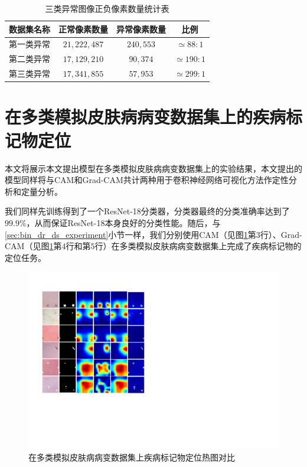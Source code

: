 \begin{table}[h]
	\centering
	\caption{三类异常图像正负像素数量统计表}
	\label{tab:multi_ds_pixel_freqs}
	\begin{tabular}{c|c|c|c}
		\toprule[2pt]
		数据集名称 & 正常像素数量 & 异常像素数量 & 比例 \\
		\midrule[2pt]
		第一类异常&  $21,222,487$ & $240,553$ & $\simeq 88: 1$ \\ \hline
		第二类异常&  $17,129,210$ & $90,374$ & $\simeq 190: 1$ \\ \hline
		第三类异常 & $17,341,855$ & $57,953$ & $\simeq 299: 1$ \\
		\bottomrule[2pt]
	\end{tabular}
\end{table}

\section{在多类模拟皮肤病病变数据集上的疾病标记物定位}\label{sec:multi_classes_experiments_res}
本文将展示本文提出模型在多类模拟皮肤病病变数据集上的实验结果，本文提出的模型同样将与CAM和Grad-CAM共计两种用于卷积神经网络可视化方法作定性分析和定量分析。

我们同样先训练得到了一个ResNet-18分类器，分类器最终的分类准确率达到了$99.9\%$，从而保证ResNet-18本身良好的分类性能。随后，与\ref{sec:bin_dr_ds_experiment}小节一样，我们分别使用CAM（见图\ref{fig:multi_simulated_skin_res}第$3$行）、Grad-CAM（见图\ref{fig:multi_simulated_skin_res}第$4$行和第$5$行）在多类模拟皮肤病病变数据集上完成了疾病标记物的定位任务。
\begin{figure}[h]
	\centering
	\includegraphics[width=1.0\textwidth]{figure/multi_simulated_skin_res.pdf}
	\caption{在多类模拟皮肤病病变数据集上疾病标记物定位热图对比}
	\label{fig:multi_simulated_skin_res}
\end{figure}

